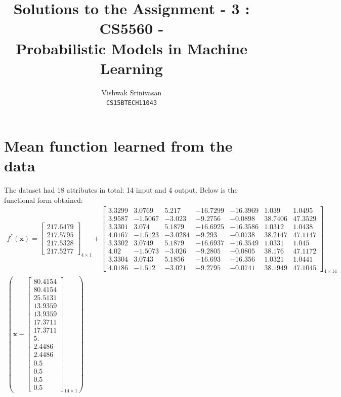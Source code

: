 \documentclass{article}
\title{Solutions to the Assignment - 3 : CS5560 - \\
Probabilistic Models in Machine Learning}
\author{Vishwak Srinivasan\\
\texttt{CS15BTECH11043}}
\date{}
\begin{document}
\maketitle

\section*{Mean function learned from the data}
The dataset had 18 attributes in total: 14 input and 4 output. Below is the functional form obtained:
\begin{multline}
f^{*}(\mathbf{x}) =
\begin{bmatrix}
217.6479 \\ 217.5795 \\ 217.5328 \\ 217.5277
\end{bmatrix}_{4 \times 1} + 
\begin{bmatrix} 
3.3299 & 3.0769 & 5.217 & -16.7299 & -16.3969 & 1.039 & 1.0495 \\
3.9587 & -1.5067 & -3.023 & -9.2756 & -0.0898 & 38.7406 & 47.3529 \\
\hline
3.3301 & 3.074 & 5.1879 & -16.6925 & -16.3586 & 1.0312 & 1.0438 \\
4.0167 & -1.5123 & -3.0284 & -9.293 & -0.0738 & 38.2147 & 47.1147 \\
\hline
3.3302 & 3.0749 & 5.1879 & -16.6937 & -16.3549 & 1.0331 & 1.045 \\
4.02 & -1.5073 & -3.026 & -9.2805 & -0.0805 & 38.176 & 47.1172 \\
\hline
3.3304 & 3.0743 & 5.1856 & -16.693 & -16.356 & 1.0321 & 1.0441 \\
4.0186 & -1.512 & -3.021 & -9.2795 & -0.0741 & 38.1949 & 47.1045
\end{bmatrix}_{4 \times 14} \\\left(\mathbf{x} -
\begin{bmatrix}
80.4154 \\ 80.4154 \\ 25.5131 \\ 13.9359 \\ 13.9359 \\ 17.3711 \\ 17.3711 \\5. \\ 2.4486
\\ 2.4486 \\ 0.5 \\ 0.5 \\ 0.5 \\ 0.5
\end{bmatrix}_{14 \times 1} \right)
\end{multline}
\end{document}
